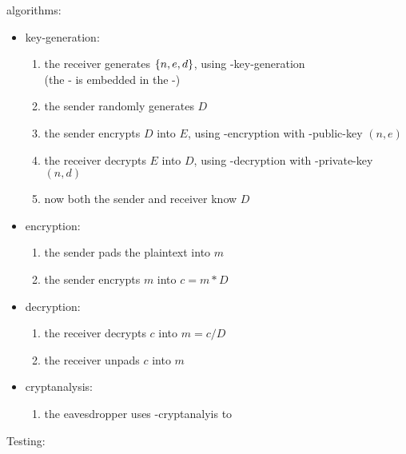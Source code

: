 algorithms:
\begin{itemize}
\item key-generation:
  \begin{enumerate}
  \item the receiver generates $\left\{ n, e, d \right\}$,
    using \rsa-key-generation \\
    (the \rsa-\cs{} is embedded in the \dummy-\cs)
  \item the sender randomly generates $D$
  \item the sender encrypts $D$ into $E$,
    using \rsa-encryption with \rsa-public-key $(n, e)$
  \item the receiver decrypts $E$ into $D$,
    using \rsa-decryption with \rsa-private-key $(n, d)$
  \item now both the sender and receiver know $D$
  \end{enumerate}
\item encryption:
  \begin{enumerate}
  \item the sender pads the plaintext into $m$
  \item the sender encrypts $m$ into $c = m * D$
  \end{enumerate}
\item decryption:
  \begin{enumerate}
  \item the receiver decrypts $c$ into $m = c / D$
  \item the receiver unpads $c$ into $m$
  \end{enumerate}
\item cryptanalysis:
  \begin{enumerate}
  \item the eavesdropper uses \rsa-cryptanalyis to
  \end{enumerate}
\end{itemize}

Testing:
\codes{}


\subsubsection{\cry{} \cf}

\codes{}
